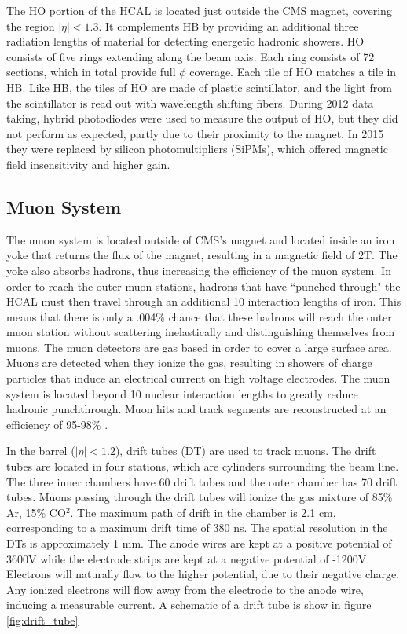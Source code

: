 \documentclass[oneside, letterpaper, oldfontcommands]{memoir}
\begin{document}
\qquad The HO portion of the HCAL is located just outside the CMS magnet, covering the region $|\eta| < 1.3$.  It complements HB by providing an additional three radiation lengths of material for detecting energetic hadronic showers. HO consists of five rings extending along the beam axis. Each ring consists of 72 sections, which in total provide full $\phi$ coverage. Each tile of HO matches a tile in HB. Like HB, the tiles of HO are made of plastic scintillator, and the light from the scintillator is read out with wavelength shifting fibers. During 2012 data taking, hybrid photodiodes were used to measure the output of HO, but they did not perform as expected, partly due to their proximity to the magnet. In 2015 they were replaced by silicon photomultipliers (SiPMs), which offered magnetic field insensitivity and higher gain\cite{Lobanov:2015jla}. 



\subsection{Muon System}\label{muonsys}
\qquad The muon system is located outside of CMS's magnet and located inside an iron yoke that returns the flux of the magnet, resulting in a magnetic field of 2T. The yoke also absorbs hadrons, thus increasing the efficiency of the muon system. In order to reach the outer muon stations, hadrons that have ``punched through" the HCAL must then travel through an additional 10 interaction lengths of iron. This means that there is only a .004\% chance that these hadrons will reach the outer muon station without scattering inelastically and distinguishing themselves from muons. The muon detectors are gas based in order to cover a large surface area. Muons are detected when they ionize the gas, resulting in showers of charge particles that induce an electrical current on high voltage electrodes. The muon system is located beyond 10 nuclear interaction lengths to greatly reduce hadronic punchthrough. Muon hits and track segments are reconstructed at an efficiency of 95-98\% \cite{Chatrchyan:2013sba}.

\qquad In the barrel ($|\eta| < 1.2$), drift tubes (DT) are used to track muons. The drift tubes are located in four stations, which are cylinders surrounding the beam line. The three inner chambers have 60 drift tubes and the outer chamber has 70 drift tubes. Muons passing through the drift tubes will ionize the gas mixture of 85\% Ar, 15\% CO$^{2}$. The maximum path of drift in the chamber is 2.1 cm, corresponding to a maximum drift time of 380 ns. The spatial resolution in the DTs is approximately 1 mm\cite{Chatrchyan:2013sba}. The anode wires are kept at a positive potential of 3600V while the electrode strips are kept at a negative potential of -1200V. Electrons will naturally flow to the higher potential, due to their negative charge. Any ionized electrons will flow away from the electrode to the anode wire, inducing a measurable current. A schematic of a drift tube is show in figure \ref{fig:drift_tube}
\end{document}
